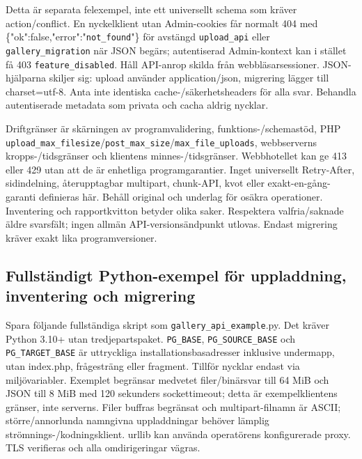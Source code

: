 \documentclass[11pt,a4paper]{article}
\newcommand{\codeword}[1]{\nolinkurl{#1}}
\begin{document}
Detta är separata felexempel, inte ett universellt schema som kräver action/conflict. En
nyckelklient utan Admin-cookies får normalt 404 med
\{"ok":false,"error":"\codeword{not_found}"\} för avstängd \codeword{upload_api} eller
\codeword{gallery_migration} när JSON begärs; autentiserad Admin-kontext kan i stället få
403 \codeword{feature_disabled}. Håll API-anrop skilda från webbläsarsessioner.
JSON-hjälparna skiljer sig: upload använder application/json, migrering lägger till
charset=utf-8. Anta inte identiska cache-/säkerhetsheaders för alla svar. Behandla
autentiserade metadata som privata och cacha aldrig nycklar.

Driftgränser är skärningen av programvalidering, funktions-/schemastöd, PHP
\codeword{upload_max_filesize}/\codeword{post_max_size}/\codeword{max_file_uploads},
webbserverns kropps-/tidsgränser och klientens minnes-/tidsgränser. Webbhotellet kan ge 413
eller 429 utan att de är enhetliga programgarantier. Inget universellt Retry-After,
sidindelning, återupptagbar multipart, chunk-API, kvot eller exakt-en-gång-garanti
definieras här. Behåll original och underlag för osäkra operationer. Inventering och
rapportkvitton betyder olika saker. Respektera valfria/saknade äldre svarsfält; ingen allmän
API-versionsändpunkt utlovas. Endast migrering kräver exakt lika programversioner.

\subsection{\texorpdfstring{Fullständigt Python-exempel för uppladdning, inventering och migrering}{Fullständigt Python-exempel för uppladdning, inventering och migrering}}

\label{api352:complete-client}

Spara följande fullständiga skript som \codeword{gallery_api_example}.py. Det kräver Python
3.10+ utan tredjepartspaket. \codeword{PG_BASE}, \codeword{PG_SOURCE_BASE} och
\codeword{PG_TARGET_BASE} är uttryckliga installationsbasadresser inklusive undermapp, utan
index.php, frågesträng eller fragment. Tillför nycklar endast via miljövariabler. Exemplet
begränsar medvetet filer/binärsvar till 64 MiB och JSON till 8 MiB med 120 sekunders
sockettimeout; detta är exempelklientens gränser, inte serverns. Filer buffras begränsat och
multipart-filnamn är ASCII; större/annorlunda namngivna uppladdningar behöver lämplig
strömnings-/kodningsklient. urllib kan använda operatörens konfigurerade proxy. TLS
verifieras och alla omdirigeringar vägras.
\end{document}
